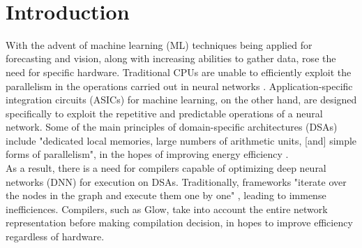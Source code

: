 \documentclass[twocolumn]{article}
\begin{document}
\

{\newpage}

\maketitle        


\section{Introduction}

With the advent of machine learning (ML) techniques being applied for forecasting and vision, along with increasing abilities to gather data, rose the need for specific hardware. Traditional CPUs are unable to efficiently exploit the parallelism in the operations carried out in neural networks \cite{sze2017hardware}. Application-specific integration circuits (ASICs) for machine learning, on the other hand, are designed specifically to exploit the repetitive and predictable operations of a neural network. Some of the main principles of domain-specific architectures (DSAs) include "dedicated local memories, large numbers of arithmetic units, [and] simple forms of parallelism", in the hopes of improving energy efficiency \cite{rotem2018glow}.\\

As a result, there is a need for compilers capable of optimizing deep neural networks (DNN) for execution on DSAs. Traditionally, frameworks "iterate over the nodes in the graph and execute them one by one" \cite{rotem2018glow}, leading to immense inefficiences. Compilers, such as Glow, take into account the entire network representation before making compilation decision, in hopes to improve efficiency regardless of hardware. \\
\end{document}
